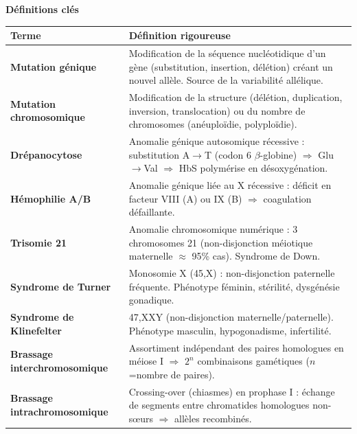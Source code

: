 \documentclass[11pt]{article}
\newcommand{\cle}[1]{{\popxbold\color{popdark}#1}}
\begin{document}
\begin{aretenir}
\textbf{Définitions clés}\par
\begin{center}
\begin{tabularx}{\linewidth}{|>{\bfseries}l|X|}\hline
\rowcolor{popblueL} \textbf{Terme} & \textbf{Définition rigoureuse} \\\hline
\cle{Mutation génique} & Modification de la séquence nucléotidique d'un gène (substitution, insertion, délétion) créant un \cle{nouvel allèle}. Source de la variabilité allélique. \\\hline
\cle{Mutation chromosomique} & Modification de la structure (délétion, duplication, inversion, translocation) ou du \cle{nombre de chromosomes} (anéuploïdie, polyploïdie). \\\hline
\cle{Drépanocytose} & Anomalie génique autosomique récessive : substitution A$\to$T (codon 6 $\beta$-globine) $\Rightarrow$ Glu$\to$Val $\Rightarrow$ HbS polymérise en désoxygénation. \\\hline
\cle{Hémophilie A/B} & Anomalie génique \cle{liée au X} récessive : déficit en facteur VIII (A) ou IX (B) $\Rightarrow$ coagulation défaillante. \\\hline
\cle{Trisomie 21} & Anomalie chromosomique numérique : 3 chromosomes 21 (non-disjonction méiotique maternelle $\approx$ 95\% cas). Syndrome de Down. \\\hline
\cle{Syndrome de Turner} & Monosomie X (45,X) : non-disjonction paternelle fréquente. Phénotype féminin, stérilité, dysgénésie gonadique. \\\hline
\cle{Syndrome de Klinefelter} & 47,XXY (non-disjonction maternelle/paternelle). Phénotype masculin, hypogonadisme, infertilité. \\\hline
\cle{Brassage interchromosomique} & Assortiment indépendant des paires homologues en méiose I $\Rightarrow$ $2^n$ combinaisons gamétiques ($n$=nombre de paires). \\\hline
\cle{Brassage intrachromosomique} & \cle{Crossing-over} (chiasmes) en prophase I : échange de segments entre chromatides homologues non-sœurs $\Rightarrow$ allèles recombinés. \\\hline
\end{tabularx}
\end{center}


\end{aretenir}
\end{document}

